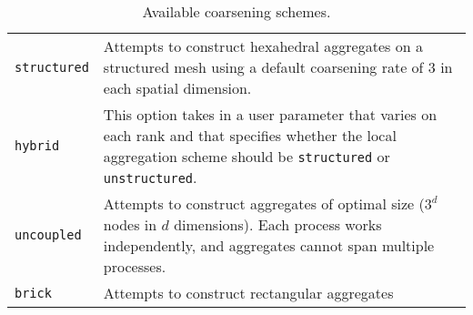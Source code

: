 \begin{table}[H]
  \begin{center}
    \begin{tabular}{p{5.0cm} p{10cm}}
      \toprule
      \verb!structured!   & Attempts to construct hexahedral aggregates on a structured
                            mesh using a default coarsening rate of $3$ in each spatial
                            dimension.\\
      \verb!hybrid!       & This option takes in a user parameter that varies on each
                            rank and that specifies whether the local aggregation
                            scheme should be \verb!structured! or \verb!unstructured!.\\
      \verb!uncoupled!    & Attempts to construct aggregates of optimal size ($3^d$
                            nodes in $d$ dimensions). Each process works independently, and
                            aggregates cannot span multiple processes.\\
      \verb!brick!        & Attempts to construct rectangular aggregates \\
      \bottomrule
    \end{tabular}
    \caption{Available coarsening schemes. }
\label{t:aggregation}
  \end{center}
\end{table}

